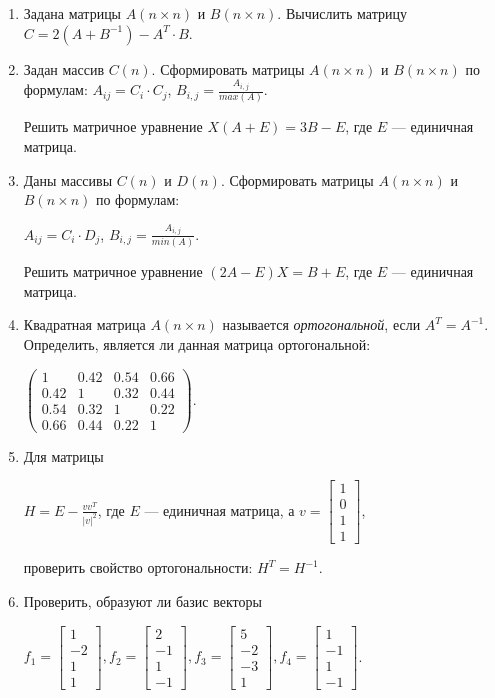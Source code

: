 \begin{enumerate}
\item Задана матрицы $A(n\times n)$ и $B(n\times n)$. Вычислить матрицу 
$C=2(A+B^{-1})-A^T\cdot B$.
\item Задан массив $C(n)$. Сформировать матрицы $A(n\times n)$ и
$B(n\times n)$ по формулам:
 $A_{ij}=C_i\cdot C_j$,  $B_{i,j}=\frac{A_{i,j}}{max(A)}$.

Решить матричное уравнение  $X(A+E)=3B-E$, где $E$ --- единичная матрица.
\item Даны массивы $C(n)$ и $D(n)$. Сформировать матрицы
$A(n\times n)$ и $B(n\times n)$ по формулам:

$A_{ij}=C_i\cdot D_j$,  $B_{i,j}=\frac{A_{i,j}}{min(A)}$.

Решить матричное уравнение  $(2A-E)X=B+E$, где $E$ --- единичная матрица.
\item  Квадратная матрица $A(n\times n)$ называется \emph{ортогональной}, если 
$A^T=A^{-1}$. Определить, является ли данная матрица ортогональной:

 $\left(\begin{matrix}1&0.42&0.54&0.66\\0.42&1&0.32&0.44\\0.54&0.32&1&0.22\\0.66&0.44&0.22&1\end{matrix}\right)$.
\item  Для матрицы

  $H=E-\displaystyle\frac{vv^T}{\left|v\right|^2}$, где $E$ --- единичная матрица, 
а $v=\left[\begin{matrix}1\\0\\1\\1\end{matrix}\right]$,

проверить свойство ортогональности:  $H^T=H^{-1}$. 
\item Проверить, образуют ли базис векторы 

$f_1=\left[\begin{matrix}1\\-2\\1\\1\end{matrix}\right], f_2=\left[\begin{matrix}2\\-1\\1\\-1\end{matrix}\right], f_3=\left[\begin{matrix}5\\-2\\-3\\1\end{matrix}\right], f_4=\left[\begin{matrix}1\\-1\\1\\-1\end{matrix}\right]$. 


\end{enumerate}
